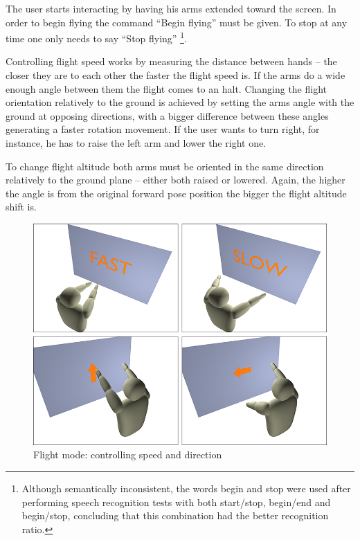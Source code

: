 The user starts interacting by having his arms extended toward the screen.
In order to begin flying the command ``Begin flying'' must be given.
To stop at any time one only needs to say ``Stop flying''
\footnote{Although semantically inconsistent, the words begin and stop were used after performing speech recognition
tests with both start/stop, begin/end and begin/stop, concluding that this combination had the better recognition ratio.}.

Controlling flight speed works by measuring the distance between hands -- the closer they are to each other the faster
the flight speed is. If the arms do a wide enough angle between them the flight comes to an halt.
Changing the flight orientation relatively to the ground is achieved by setting the arms angle with the ground at opposing directions,
with a bigger difference between these angles generating a faster rotation movement. If the user wants to turn right, for instance,
he has to raise the left arm and lower the right one.

To change flight altitude both arms must be oriented in the same direction relatively to the ground plane
-- either both raised or lowered. Again, the higher the angle is from the original forward pose position
the bigger the flight altitude shift is.

\begin{figure}[ht]
	\centering
		\includegraphics[scale=0.3]{gfx/flight.png}
	\caption{Flight mode: controlling speed and direction}
	\label{fig:flight}
\end{figure}



